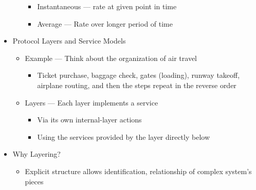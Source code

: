 \begin{itemize}
\begin{itemize}
        \begin{itemize}

          \item Instantaneous — rate at given point in time

          \item Average — Rate over longer period of time

        \end{itemize}

    \end{itemize}

  \item Protocol Layers and Service Models

    \begin{itemize}

      \item Example — Think about the organization of air travel

        \begin{itemize}

          \item Ticket purchase, baggage check, gates (loading), runway takeoff, airplane routing, and then the steps repeat in the reverse order

        \end{itemize}

      \item Layers — Each layer implements a service

        \begin{itemize}

          \item Via its own internal-layer actions

          \item Using the services provided by the layer directly below

        \end{itemize}

    \end{itemize}

  \item Why Layering?

    \begin{itemize}

      \item Explicit structure allows identification, relationship of complex system's pieces

        \begin{itemize}


\end{itemize}
\end{itemize}
\end{itemize}
